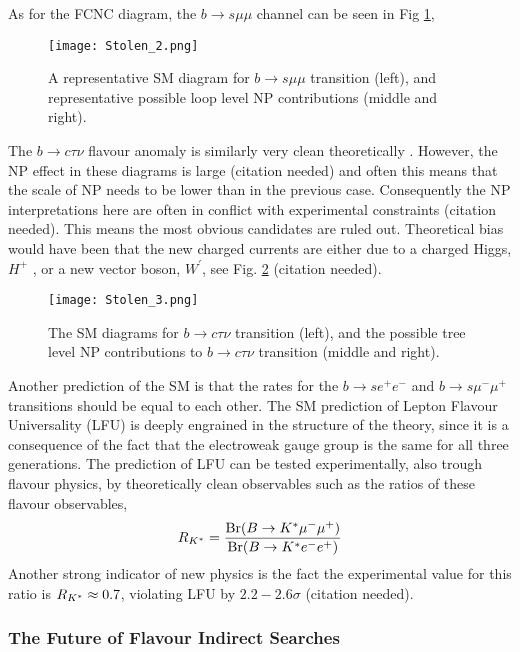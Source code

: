 As for the FCNC diagram, the $b \rightarrow s \mu \mu$ channel can be seen in Fig \ref{fig:Flavour_D_2_Muon}, 
%
\begin{figure}[H]
	\centering
	\texttt{[image: Stolen\_2.png]}
	\caption{A representative SM diagram for $b \rightarrow s \mu \mu$ transition (left), and representative possible loop level NP
contributions (middle and right).}
	\label{fig:Flavour_D_2_Muon}
\end{figure}
%
The $b \rightarrow c \tau \nu$ flavour anomaly is similarly very clean theoretically \cite{Fajfer_2012}. However, the NP effect in these diagrams is large {\color{blue} (citation needed)} and often this means that the scale of NP needs to be lower than in the previous case. Consequently the NP interpretations here are often in conflict with experimental constraints {\color{blue} (citation needed)}.
%
This means the most obvious candidates are ruled out. Theoretical bias would have been that the new charged currents are either due to a charged Higgs, $H^+$ , or a new vector boson, $W^\prime$, see Fig. \ref{fig:Flavour_D_3_Tau} {\color{blue} (citation needed)}.
%
\begin{figure}[H]	
	\centering
	\texttt{[image: Stolen\_3.png]}
	\caption{The SM diagrams for $b \rightarrow c \tau \nu$ transition (left), and the possible tree level NP contributions to $b \rightarrow c \tau \nu$ transition (middle and right).}
	\label{fig:Flavour_D_3_Tau}
\end{figure}
%
Another prediction of the SM is that the rates for the  $b \rightarrow s e^+ e^-$ and  $b \rightarrow s \mu^- \mu^+$ transitions should be equal to each other.
%
The SM prediction of Lepton Flavour Universality (LFU) is deeply engrained in the structure of the theory, since it is a consequence of the fact that the electroweak gauge group is the same for all three generations. 
%
The prediction of LFU can be tested experimentally, also trough flavour physics, by theoretically clean observables such as the ratios of these flavour observables, 
%
\begin{equation}
R_{K^{\**}} = \frac{\text{Br}( B \rightarrow K^{\**} \mu^- \mu^+ )}{\text{Br} (  B \rightarrow K^{\**} e^- e^+  )}
\end{equation}
% 
Another strong indicator of new physics is the fact the experimental value for this ratio is $R_{K^{\**}} \approx 0.7$, violating LFU by $2.2 - 2.6 \sigma$ {\color{blue} (citation needed)}.

\subsubsection{The Future of Flavour Indirect Searches}

